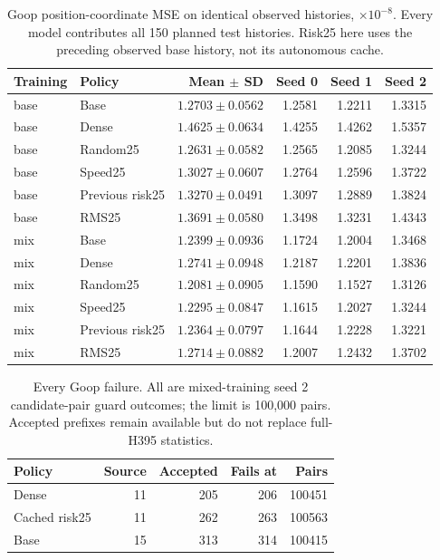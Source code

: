 \begin{table}[t]
\centering\small
\caption{Goop position-coordinate MSE on identical observed histories, $\times10^{-8}$. Every model contributes all 150 planned test histories. Risk25 here uses the preceding observed base history, not its autonomous cache.}
\label{tab:goop-all-observed}
\begin{tabular}{llrrrr}
\toprule
Training & Policy & Mean $\pm$ SD & Seed 0 & Seed 1 & Seed 2\\
\midrule
base & Base & $1.2703\pm0.0562$ & 1.2581 & 1.2211 & 1.3315\\
base & Dense & $1.4625\pm0.0634$ & 1.4255 & 1.4262 & 1.5357\\
base & Random25 & $1.2631\pm0.0582$ & 1.2565 & 1.2085 & 1.3244\\
base & Speed25 & $1.3027\pm0.0607$ & 1.2764 & 1.2596 & 1.3722\\
base & Previous risk25 & $1.3270\pm0.0491$ & 1.3097 & 1.2889 & 1.3824\\
base & RMS25 & $1.3691\pm0.0580$ & 1.3498 & 1.3231 & 1.4343\\
\midrule
mix & Base & $1.2399\pm0.0936$ & 1.1724 & 1.2004 & 1.3468\\
mix & Dense & $1.2741\pm0.0948$ & 1.2187 & 1.2201 & 1.3836\\
mix & Random25 & $1.2081\pm0.0905$ & 1.1590 & 1.1527 & 1.3126\\
mix & Speed25 & $1.2295\pm0.0847$ & 1.1615 & 1.2027 & 1.3244\\
mix & Previous risk25 & $1.2364\pm0.0797$ & 1.1644 & 1.2228 & 1.3221\\
mix & RMS25 & $1.2714\pm0.0882$ & 1.2007 & 1.2432 & 1.3702\\
\bottomrule
\end{tabular}
\end{table}

\begin{table}[t]
\centering\small
\caption{Every Goop failure. All are mixed-training seed 2 candidate-pair guard outcomes; the limit is 100,000 pairs. Accepted prefixes remain available but do not replace full-H395 statistics.}
\label{tab:goop-all-failures}
\begin{tabular}{lrrrr}
\toprule
Policy & Source & Accepted & Fails at & Pairs\\
\midrule
Dense & 11 & 205 & 206 & 100451\\
Cached risk25 & 11 & 262 & 263 & 100563\\
Base & 15 & 313 & 314 & 100415\\
\bottomrule
\end{tabular}
\end{table}

